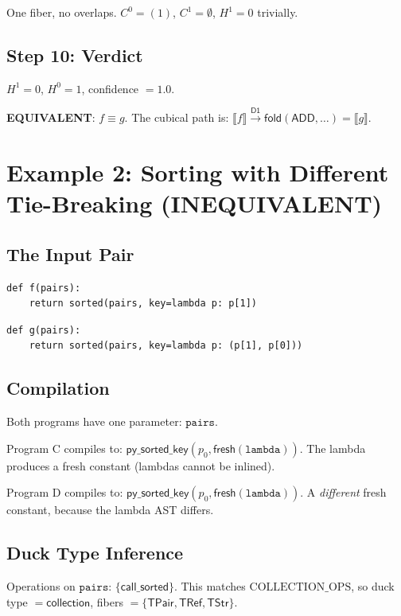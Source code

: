 \documentclass[11pt,a4paper]{report}
\theoremstyle{definition}
\theoremstyle{plain}
\newcommand{\den}[1]{\llbracket #1 \rrbracket}
\newcommand{\fold}{\mathsf{fold}}
\newcommand{\Hzero}{H^0}
\newcommand{\Hone}{H^1}
\begin{document}
One fiber, no overlaps.  $C^0 = (1)$, $C^1 = \emptyset$,
$\Hone = 0$ trivially.

\subsection{Step 10: Verdict}

$\Hone = 0$, $\Hzero = 1$, confidence $= 1.0$.

\textbf{EQUIVALENT}: $f \equiv g$.  The cubical path is:
$\den{f} \xrightarrow{\mathsf{D1}} \fold(\mathsf{ADD}, \ldots)
= \den{g}$.


\section{Example 2: Sorting with Different Tie-Breaking (INEQUIVALENT)}

\subsection{The Input Pair}

\begin{lstlisting}[caption={Program C: sort by value}]
def f(pairs):
    return sorted(pairs, key=lambda p: p[1])
\end{lstlisting}

\begin{lstlisting}[caption={Program D: sort by value, then key}]
def g(pairs):
    return sorted(pairs, key=lambda p: (p[1], p[0]))
\end{lstlisting}

\subsection{Compilation}

Both programs have one parameter: $\texttt{pairs}$.

Program C compiles to:
$\mathsf{py\_sorted\_key}(p_0, \mathsf{fresh}(\texttt{lambda}))$.
The lambda produces a fresh constant (lambdas cannot be inlined).

Program D compiles to:
$\mathsf{py\_sorted\_key}(p_0, \mathsf{fresh}(\texttt{lambda}))$.
A \emph{different} fresh constant, because the lambda AST differs.

\subsection{Duck Type Inference}

Operations on $\texttt{pairs}$: $\{\mathsf{call\_sorted}\}$.
This matches $\mathrm{COLLECTION\_OPS}$, so
duck type $= \mathsf{collection}$,
fibers $= \{\mathsf{TPair}, \mathsf{TRef}, \mathsf{TStr}\}$.
\end{document}
